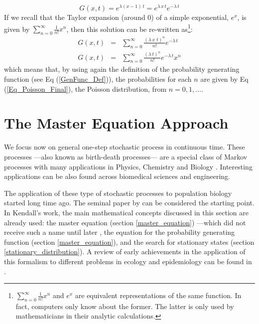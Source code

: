 \documentclass{article}
\begin{document}
\begin{equation}
    G(x, t)= e^{\lambda(x-1)\,t} = e^{\lambda\,x\,t} e^{-\lambda\,t}
\end{equation}
If we recall that the Taylor expansion (around 0) of a simple exponential, $e^x$, is given by $\sum\limits_{n=0}^{\infty} \frac{1}{n!} x^n$, then this solution can be re-written as\footnote{$\sum\limits_{n=0}^{\infty} \frac{1}{n!} x^n$ and $e^x$ are equivalent representations of the same function. In fact, computers only know about the former. The latter is only used by mathematicians in their analytic calculations.}:
\begin{eqnarray}
    G(x, t) &=& \sum\limits_{n=0}^{\infty} \frac{(\lambda\,x\,\,t)^n}{n!} e^{-\lambda\,t} \nonumber \\
    G(x, t) &=& \sum\limits_{n=0}^{\infty} \frac{(\lambda\,t)^n}{n!} e^{-\lambda\,t} x^n 
\end{eqnarray}
which means that, by using again the definition of the probability generating function (see Eq (\ref{GenFunc_Def})), the probabilities for each $n$ are given by Eq (\ref{Eq_Poisson_Final}), the Poisson distribution, from $n=0,1, \dots$.

\section{The Master Equation Approach}
\label{MEq_Approach}
We focus now on general one-step stochastic process in continuous time. These processes ---also known as birth-death processes--- are a special class of Markov processes with many applications in Physics, Chemistry and Biology \citep{vanKampen92}. Interesting applications can be also found across biomedical sciences and engineering. 
\smallskip

The application of these type of stochastic processes to population biology started long time ago. The seminal paper by \cite{Kendall48} can be considered the starting point. In Kendall's work, the main mathematical concepts discussed in this section are already used: the master equation (section \ref{master_equation}) ---which did not receive such a name until later \citep{vanKampen92}, the equation for the probability generating function (section \ref{master_equation}), and the search for stationary states (section \ref{stationary_distribution}). A review of early achievements in the application of this formalism to different problems in ecology and epidemiology can be found in \cite{Barlett60}.
\smallskip
\end{document}
